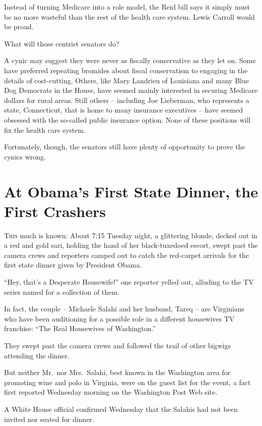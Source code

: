 ﻿\documentclass[12pt]{article}
\begin{document}
Instead of turning Medicare into a role model, the Reid bill says it simply must be no more wasteful
than the rest of the health care system. Lewis Carroll would be proud.

What will those centrist senators do?

A cynic may suggest they were never as fiscally conservative as they let on. Some have preferred
repeating bromides about fiscal conservatism to engaging in the details of cost-cutting. Others,
like Mary Landrieu of Louisiana and many Blue Dog Democrats in the House, have seemed mainly
interested in securing Medicare dollars for rural areas. Still others -- including Joe Lieberman,
who represents a state, Connecticut, that is home to many insurance executives -- have seemed
obsessed with the so-called public insurance option. None of these positions will fix the health
care system.

Fortunately, though, the senators still have plenty of opportunity to prove the cynics wrong.

\section{At Obama's First State Dinner, the First Crashers}

\lettrine{T}{his} much is known: About 7:15 Tuesday night, a glittering
blonde, decked out in a red and gold sari, holding the hand of her black-tuxedoed escort, swept past
the camera crews and reporters camped out to catch the red-carpet arrivals for the first state
dinner given by President Obama.

``Hey, that's a Desperate Housewife!'' one reporter yelled out, alluding to the TV series named for
a collection of them.

In fact, the couple -- Michaele Salahi and her husband, Tareq -- are Virginians who have been
auditioning for a possible role in a different housewives TV franchise: ``The Real Housewives of
Washington.''

They swept past the camera crews and followed the trail of other bigwigs attending the dinner.

But neither Mr.~nor Mrs.~Salahi, best known in the Washington area for promoting wine and polo in
Virginia, were on the guest list for the event, a fact first reported Wednesday morning on the
Washington Post Web site.

A White House official confirmed Wednesday that the Salahis had not been invited nor seated for
dinner.
\end{document}
